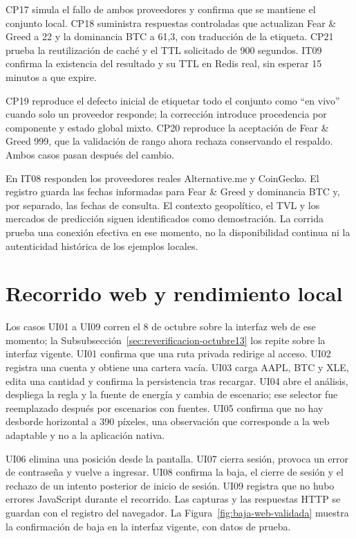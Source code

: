 CP17 simula el fallo de ambos proveedores y confirma que se mantiene el conjunto local. CP18 suministra respuestas controladas que actualizan Fear \& Greed a 22 y la dominancia BTC a 61,3, con traducción de la etiqueta. CP21 prueba la reutilización de caché y el TTL solicitado de 900 segundos. IT09 confirma la existencia del resultado y su TTL en Redis real, sin esperar 15 minutos a que expire.

CP19 reproduce el defecto inicial de etiquetar todo el conjunto como \enquote{en vivo} cuando solo un proveedor responde; la corrección introduce procedencia por componente y estado global mixto. CP20 reproduce la aceptación de Fear \& Greed 999, que la validación de rango ahora rechaza conservando el respaldo. Ambos casos pasan después del cambio.

En IT08 responden los proveedores reales Alternative.me y CoinGecko. El registro guarda las fechas informadas para Fear \& Greed y dominancia BTC y, por separado, las fechas de consulta. El contexto geopolítico, el TVL y los mercados de predicción siguen identificados como demostración. La corrida prueba una conexión efectiva en ese momento, no la disponibilidad continua ni la autenticidad histórica de los ejemplos locales.

\section{Recorrido web y rendimiento local}\label{sec:pruebas-integracion}

Los casos UI01 a UI09 corren el 8 de octubre sobre la interfaz web de ese momento; la Subsubsección~\ref{sec:reverificacion-octubre13} los repite sobre la interfaz vigente. UI01 confirma que una ruta privada redirige al acceso. UI02 registra una cuenta y obtiene una cartera vacía. UI03 carga AAPL, BTC y XLE, edita una cantidad y confirma la persistencia tras recargar. UI04 abre el análisis, despliega la regla y la fuente de energía y cambia de escenario; ese selector fue reemplazado después por escenarios con fuentes. UI05 confirma que no hay desborde horizontal a 390 píxeles, una observación que corresponde a la web adaptable y no a la aplicación nativa.

UI06 elimina una posición desde la pantalla. UI07 cierra sesión, provoca un error de contraseña y vuelve a ingresar. UI08 confirma la baja, el cierre de sesión y el rechazo de un intento posterior de inicio de sesión. UI09 registra que no hubo errores JavaScript durante el recorrido. Las capturas y las respuestas HTTP se guardan con el registro del navegador. La Figura~\ref{fig:baja-web-validada} muestra la confirmación de baja en la interfaz vigente, con datos de prueba.

